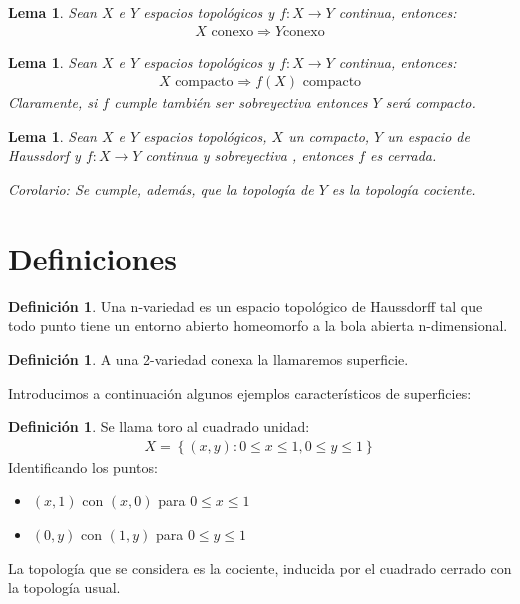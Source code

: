 \documentclass[a4paper,11pt,spanish, twoside, leqno]{tfg-uam}
\newtheorem{lema}[teor]{Lema}
\theoremstyle{definition}
\newtheorem{defin}[teor]{Definici\'on}
\begin{document}
\begin{lema}\label{lema:conexoAconexo}
	Sean $X$ e $Y$ espacios topológicos y $f: X \longrightarrow Y$ continua, entonces: 
	\begin{align*}
	X \textrm{ conexo} \Rightarrow Y \textrm{conexo}
	\end{align*}
\end{lema}


\begin{lema}\label{lema:compactoAcompacto}
	Sean $X$ e $Y$ espacios topológicos y $f: X \longrightarrow Y$ continua, entonces: 
	\begin{align*}
	X \textrm{ compacto} \Rightarrow f(X) \textrm{ compacto}
	\end{align*}
	Claramente, si $f$ cumple también ser sobreyectiva entonces $Y$ será compacto.
\end{lema} 



\begin{lema}\label{lema:XcompactoYt2fcontinua}
	Sean $X$ e  $Y$ espacios topológicos, $X$ un compacto, $Y$ un espacio de Haussdorf y $f: X \longrightarrow Y$ continua y sobreyectiva , entonces $f$ es cerrada.
	
	Corolario: Se cumple, además, que la topología de $Y$ es la topología cociente.
\end{lema}


\section{Definiciones}


\begin{defin}\label{defin:nvariedad}
	Una n-variedad es un espacio topológico de Haussdorff tal que todo punto tiene un entorno abierto homeomorfo a la bola abierta n-dimensional.
\end{defin}



\begin{defin}\label{defin:superficie}
	A una 2-variedad conexa la llamaremos superficie.
\end{defin}

Introducimos a continuación algunos ejemplos característicos de superficies:
\begin{defin}\label{defin:toro}
	Se llama toro al cuadrado unidad:
	\begin{align*}
		X = \left\{(x,y): 0\leq x\leq 1, 0\leq y\leq 1  \right\} 
	\end{align*}
	Identificando los puntos:
	\begin{itemize}
		\item 
		$(x,1)$ con $(x,0)$ para $0\leq x\leq 1$
		\item 
		$(0,y)$ con $(1,y)$ para $0\leq y\leq 1$
	\end{itemize}
La topología que se considera es la cociente, inducida por el cuadrado cerrado con la topología usual.
\end{defin}
\end{document}
